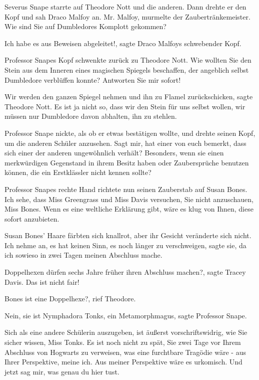 Severus Snape starrte auf Theodore Nott und die anderen. Dann drehte er den Kopf
und sah Draco Malfoy an. \glqq{}Mr. Malfoy\grqq{}, murmelte der
Zaubertränkemeister. \glqq{}Wie sind Sie auf Dumbledores Komplott gekommen?\grqq{}

\glqq{}Ich habe es aus Beweisen abgeleitet!\grqq{}, sagte Draco Malfoys
schwebender Kopf.

Professor Snapes Kopf schwenkte zurück zu Theodore Nott. \glqq{}Wie wollten Sie
den Stein aus dem Inneren eines magischen Spiegels beschaffen, der angeblich
selbst Dumbledore verblüffen konnte? Antworten Sie mir sofort!\grqq{}

\glqq{}Wir werden den ganzen Spiegel nehmen und ihn zu Flamel
zurückschicken\grqq{}, sagte Theodore Nott. \glqq{}Es ist ja nicht so, dass wir
den Stein für uns selbst wollen, wir müssen nur Dumbledore davon abhalten, ihn
zu stehlen.\grqq{}

Professor Snape nickte, als ob er etwas bestätigen wollte, und drehte seinen
Kopf, um die anderen Schüler anzusehen. \glqq{}Sagt mir, hat einer von euch
bemerkt, dass sich einer der anderen ungewöhnlich verhält? Besonders, wenn sie
einen merkwürdigen Gegenstand in ihrem Besitz haben oder Zaubersprüche benutzen
können, die ein Erstklässler nicht kennen sollte?\grqq{}

Professor Snapes rechte Hand richtete nun seinen Zauberstab auf Susan Bones.
\glqq{}Ich sehe, dass Miss Greengrass und Miss Davis versuchen, Sie nicht
anzuschauen, Miss Bones. Wenn es eine weltliche Erklärung gibt, wäre es klug von
Ihnen, diese sofort anzubieten.\grqq{}

Susan Bones' Haare färbten sich knallrot, aber ihr Gesicht veränderte sich
nicht. \glqq{}Ich nehme an, es hat keinen Sinn, es noch länger zu
verschweigen\grqq{}, sagte sie, \glqq{}da ich sowieso in zwei Tagen meinen
Abschluss mache.\grqq{}

\glqq{}Doppelhexen dürfen sechs Jahre früher ihren Abschluss machen?\grqq{},
sagte Tracey Davis. \glqq{}Das ist nicht fair!\grqq{}

\glqq{}Bones ist eine Doppelhexe?\grqq{}, rief Theodore.

\glqq{}Nein, sie ist Nymphadora Tonks, ein Metamorphmagus\grqq{}, sagte Professor
Snape.

\glqq{}Sich als eine andere Schülerin auszugeben, ist äußerst vorschriftswidrig,
wie Sie sicher wissen, Miss Tonks. Es ist noch nicht zu spät, Sie zwei Tage vor
Ihrem Abschluss von Hogwarts zu verweisen, was eine furchtbare Tragödie wäre -
aus Ihrer Perspektive, meine ich. Aus meiner Perspektive wäre es urkomisch. Und
jetzt sag mir, was genau du hier tust.\grqq{}

